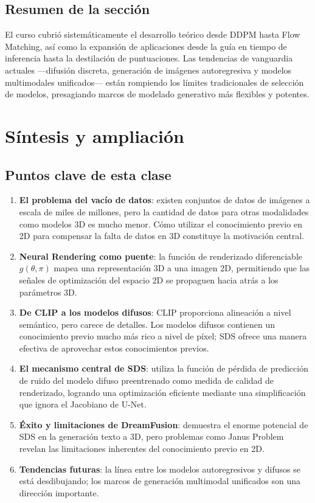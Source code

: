 \documentclass[a4paper]{article}
\begin{document}
\subsection{Resumen de la sección}

El curso cubrió sistemáticamente el desarrollo teórico desde DDPM hasta Flow Matching, así como la expansión de aplicaciones desde la guía en tiempo de inferencia hasta la destilación de puntuaciones. Las tendencias de vanguardia actuales —difusión discreta, generación de imágenes autoregresiva y modelos multimodales unificados— están rompiendo los límites tradicionales de selección de modelos, presagiando marcos de modelado generativo más flexibles y potentes.

\newpage
\section{Síntesis y ampliación}

\subsection{Puntos clave de esta clase}

\begin{enumerate}
    \item \textbf{El problema del vacío de datos}: existen conjuntos de datos de imágenes a escala de miles de millones, pero la cantidad de datos para otras modalidades como modelos 3D es mucho menor. Cómo utilizar el conocimiento previo en 2D para compensar la falta de datos en 3D constituye la motivación central.

    \item \textbf{Neural Rendering como puente}: la función de renderizado diferenciable $g(\theta, \pi)$ mapea una representación 3D a una imagen 2D, permitiendo que las señales de optimización del espacio 2D se propaguen hacia atrás a los parámetros 3D.

    \item \textbf{De CLIP a los modelos difusos}: CLIP proporciona alineación a nivel semántico, pero carece de detalles. Los modelos difusos contienen un conocimiento previo mucho más rico a nivel de píxel; SDS ofrece una manera efectiva de aprovechar estos conocimientos previos.

    \item \textbf{El mecanismo central de SDS}: utiliza la función de pérdida de predicción de ruido del modelo difuso preentrenado como medida de calidad de renderizado, logrando una optimización eficiente mediante una simplificación que ignora el Jacobiano de U-Net.

    \item \textbf{Éxito y limitaciones de DreamFusion}: demuestra el enorme potencial de SDS en la generación texto a 3D, pero problemas como Janus Problem revelan las limitaciones inherentes del conocimiento previo en 2D.

    \item \textbf{Tendencias futuras}: la línea entre los modelos autoregresivos y difusos se está desdibujando; los marcos de generación multimodal unificados son una dirección importante.
\end{enumerate}
\end{document}
